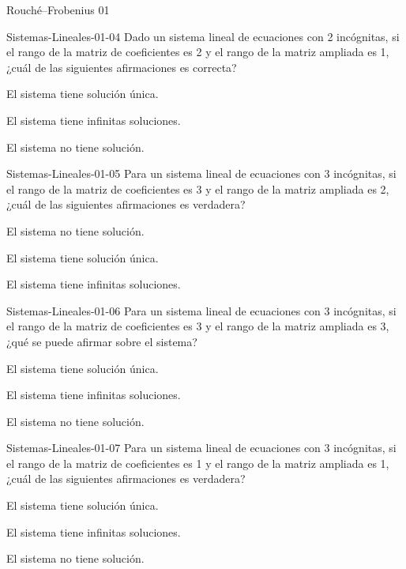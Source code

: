 \documentclass[a4,11pt]{aleph-notas}
\begin{document}
\begin{quiz}{Rouché–Frobenius 01}
\begin{multi}[]%
    {Sistemas-Lineales-01-04}
    Dado un sistema lineal de ecuaciones con 2 incógnitas, si el rango de la matriz de coeficientes es 2 y el rango de la matriz ampliada es 1, ¿cuál de las siguientes afirmaciones es correcta?
    \item El sistema tiene solución única.
    \item El sistema tiene infinitas soluciones.
    \item* El sistema no tiene solución.
\end{multi}
    
\begin{multi}[]%
    {Sistemas-Lineales-01-05}
    Para un sistema lineal de ecuaciones con 3 incógnitas, si el rango de la matriz de coeficientes es 3 y el rango de la matriz ampliada es 2, ¿cuál de las siguientes afirmaciones es verdadera?
    \item* El sistema no tiene solución.
    \item El sistema tiene solución única.
    \item El sistema tiene infinitas soluciones.
\end{multi}
    
    \begin{multi}[]%
    {Sistemas-Lineales-01-06}
    Para un sistema lineal de ecuaciones con 3 incógnitas, si el rango de la matriz de coeficientes es 3 y el rango de la matriz ampliada es 3, ¿qué se puede afirmar sobre el sistema?
    \item* El sistema tiene solución única.
    \item El sistema tiene infinitas soluciones.
    \item El sistema no tiene solución.
    \end{multi}
    
\begin{multi}[]%
    {Sistemas-Lineales-01-07}
    Para un sistema lineal de ecuaciones con 3 incógnitas, si el rango de la matriz de coeficientes es 1 y el rango de la matriz ampliada es 1, ¿cuál de las siguientes afirmaciones es verdadera?
    \item El sistema tiene solución única.
    \item* El sistema tiene infinitas soluciones.
    \item El sistema no tiene solución.
\end{multi}


\end{quiz}
\end{document}
